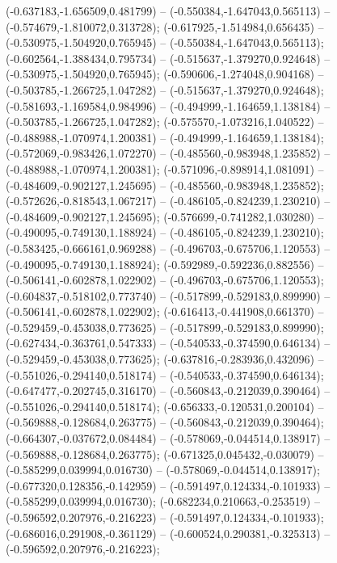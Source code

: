  (-0.637183,-1.656509,0.481799) -- (-0.550384,-1.647043,0.565113) -- (-0.574679,-1.810072,0.313728);
 (-0.617925,-1.514984,0.656435) -- (-0.530975,-1.504920,0.765945) -- (-0.550384,-1.647043,0.565113);
 (-0.602564,-1.388434,0.795734) -- (-0.515637,-1.379270,0.924648) -- (-0.530975,-1.504920,0.765945);
 (-0.590606,-1.274048,0.904168) -- (-0.503785,-1.266725,1.047282) -- (-0.515637,-1.379270,0.924648);
 (-0.581693,-1.169584,0.984996) -- (-0.494999,-1.164659,1.138184) -- (-0.503785,-1.266725,1.047282);
 (-0.575570,-1.073216,1.040522) -- (-0.488988,-1.070974,1.200381) -- (-0.494999,-1.164659,1.138184);
 (-0.572069,-0.983426,1.072270) -- (-0.485560,-0.983948,1.235852) -- (-0.488988,-1.070974,1.200381);
 (-0.571096,-0.898914,1.081091) -- (-0.484609,-0.902127,1.245695) -- (-0.485560,-0.983948,1.235852);
 (-0.572626,-0.818543,1.067217) -- (-0.486105,-0.824239,1.230210) -- (-0.484609,-0.902127,1.245695);
 (-0.576699,-0.741282,1.030280) -- (-0.490095,-0.749130,1.188924) -- (-0.486105,-0.824239,1.230210);
 (-0.583425,-0.666161,0.969288) -- (-0.496703,-0.675706,1.120553) -- (-0.490095,-0.749130,1.188924);
 (-0.592989,-0.592236,0.882556) -- (-0.506141,-0.602878,1.022902) -- (-0.496703,-0.675706,1.120553);
 (-0.604837,-0.518102,0.773740) -- (-0.517899,-0.529183,0.899990) -- (-0.506141,-0.602878,1.022902);
 (-0.616413,-0.441908,0.661370) -- (-0.529459,-0.453038,0.773625) -- (-0.517899,-0.529183,0.899990);
 (-0.627434,-0.363761,0.547333) -- (-0.540533,-0.374590,0.646134) -- (-0.529459,-0.453038,0.773625);
 (-0.637816,-0.283936,0.432096) -- (-0.551026,-0.294140,0.518174) -- (-0.540533,-0.374590,0.646134);
 (-0.647477,-0.202745,0.316170) -- (-0.560843,-0.212039,0.390464) -- (-0.551026,-0.294140,0.518174);
 (-0.656333,-0.120531,0.200104) -- (-0.569888,-0.128684,0.263775) -- (-0.560843,-0.212039,0.390464);
 (-0.664307,-0.037672,0.084484) -- (-0.578069,-0.044514,0.138917) -- (-0.569888,-0.128684,0.263775);
 (-0.671325,0.045432,-0.030079) -- (-0.585299,0.039994,0.016730) -- (-0.578069,-0.044514,0.138917);
 (-0.677320,0.128356,-0.142959) -- (-0.591497,0.124334,-0.101933) -- (-0.585299,0.039994,0.016730);
 (-0.682234,0.210663,-0.253519) -- (-0.596592,0.207976,-0.216223) -- (-0.591497,0.124334,-0.101933);
 (-0.686016,0.291908,-0.361129) -- (-0.600524,0.290381,-0.325313) -- (-0.596592,0.207976,-0.216223);
